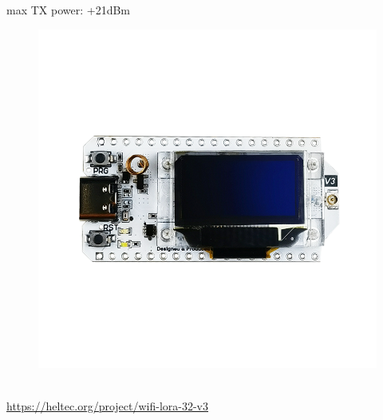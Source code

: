 \documentclass[12pt,a4paper]{article}
\begin{document}
max TX power: +21dBm\\
\begin{figure}[h]
	\includegraphics[scale=0.1]{heltec-lora32-v3.png}
\end{figure}\\
\url{https://heltec.org/project/wifi-lora-32-v3}\\
\end{document}

